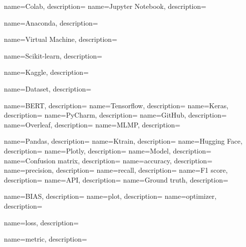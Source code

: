{
    name=Colab, description=\nopostdesc
}
{
    name=Jupyter Notebook,
    description=\nopostdesc
}

{
    name=Anaconda,
   description=\nopostdesc
}

{
    name=Virtual Machine,
    description=\nopostdesc
}


{
    name=Scikit-learn,
    description=\nopostdesc
}

{
    name=Kaggle,
    description=\nopostdesc
}

{
    name=Dataset,
    description=\nopostdesc
}


{
    name=BERT, description=\nopostdesc
}
{
    name=Tensorflow, description=\nopostdesc
}
{
    name=Keras, description=\nopostdesc
}
{
    name=PyCharm, description=\nopostdesc
}
{
    name=GitHub, description=\nopostdesc
}
{
    name=Overleaf, description=\nopostdesc
}
{
    name=MLMP, description=\nopostdesc
}

{
    name=Pandas, description=\nopostdesc
}
{
    name=Ktrain, description=\nopostdesc
}
{
    name=Hugging Face, description=\nopostdesc
}
{
    name=Plotly, description=\nopostdesc
}
{
    name=Model, description=\nopostdesc
}
{
    name=Confusion matrix, description=\nopostdesc
}
{
    name=accuracy, description=\nopostdesc
}
{
    name=precision, description=\nopostdesc
}
{
    name=recall, description=\nopostdesc
}
{
    name=F1 score, description=\nopostdesc
}
{
    name=API, description=\nopostdesc
}
{
    name=Ground truth, description=\nopostdesc
}

{
    name=BIAS, description=\nopostdesc
}
{
    name=plot, description=\nopostdesc
}
{
    name=optimizer, description=\nopostdesc
}

{
    name=loss, description=\nopostdesc
}

{
    name=metric, description=\nopostdesc
}
